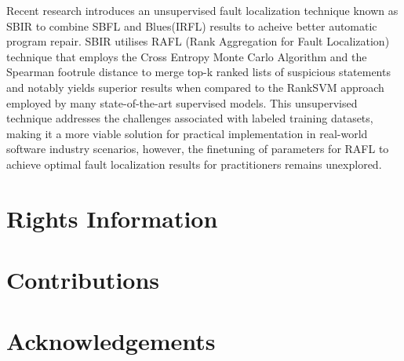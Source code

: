 \documentclass[sigconf]{acmart}
\begin{document}
	Recent research introduces an unsupervised fault localization technique known as SBIR \cite{motwani2023better} to combine SBFL and Blues(IRFL) results to acheive better automatic program repair. SBIR utilises RAFL (Rank Aggregation for Fault Localization) technique that employs the Cross Entropy Monte Carlo Algorithm and the Spearman footrule distance to merge top-k ranked lists of suspicious statements and notably yields superior results when compared to the RankSVM approach employed by many state-of-the-art supervised models. This unsupervised technique addresses the challenges associated with labeled training datasets, making it a more viable solution for practical implementation in real-world software industry scenarios, however, the finetuning of parameters for RAFL to achieve optimal fault localization results for practitioners remains unexplored.
	
	
 

\section{Rights Information}

\section{Contributions}

\section{Acknowledgements}




\end{document}
